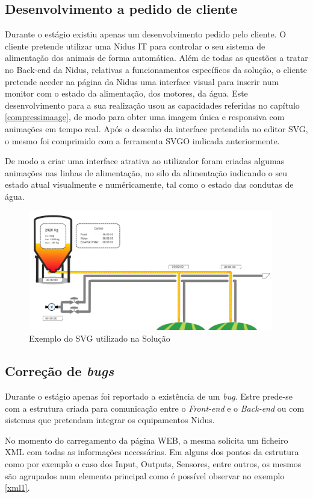 \subsection{Desenvolvimento a pedido de cliente}\label{custom}

\par Durante o estágio existiu apenas um desenvolvimento pedido pelo cliente. O cliente pretende utilizar uma Nidus IT para controlar o seu sistema de alimentação dos animais de forma automática. Além de todas as questões a tratar no Back-end da Nidus, relativas a funcionamentos específicos da solução, o cliente pretende aceder na página da Nidus uma interface visual para inserir num monitor com o estado da alimentação, dos motores, da água. Este desenvolvimento para a sua realização usou as capacidades referidas no capítulo \ref{compressimaage}, de modo para obter uma imagem única e responsiva com animações em tempo real. Após o desenho da interface pretendida no editor SVG, o mesmo foi comprimido com a ferramenta SVGO indicada anteriormente. \par De modo a criar uma interface atrativa ao utilizador foram criadas algumas animações nas linhas de alimentação, no silo da alimentação indicando o seu estado atual visualmente e numéricamente, tal como o estado das condutas de água.

\begin{figure}[ht]
\centering
\includegraphics[width=0.95\textwidth]{images/svgpig.png}
\caption{Exemplo do SVG utilizado na Solução}\label{pig}
\end{figure}

\subsection{Correção de \textit{bugs}}\label{Bug}

\par Durante o estágio apenas foi reportado a existência de um \textit{bug}. Estre prede-se com a estrutura criada para comunicação entre o \textit{Front-end} e o \textit{Back-end} ou com sistemas que pretendam integrar os equipamentos Nidus.
\par No momento do carregamento da página WEB, a mesma solicita um ficheiro XML com todas as informações necessárias. Em alguns dos pontos da estrutura como por exemplo o caso dos Input, Outputs, Sensores, entre outros, os mesmos são agrupados num elemento principal como é possível observar no exemplo \ref{xml1}.


